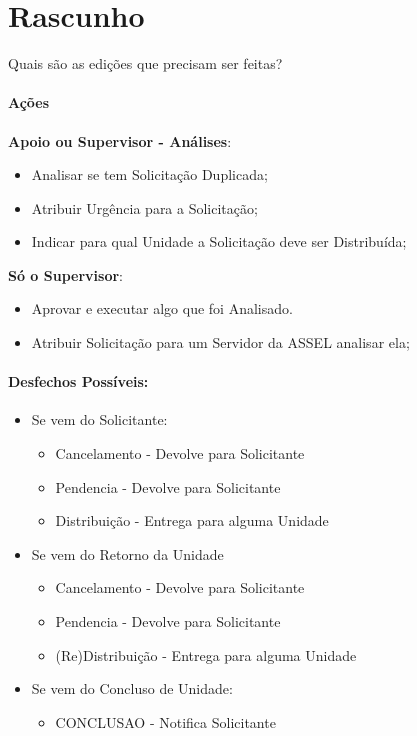 \chapter{Rascunho}

	Quais são as edições que precisam ser feitas?
	
	\subsubsection{Ações}
	\textbf{Apoio ou Supervisor - Análises}:
	\begin{itemize}
		\item Analisar se tem Solicitação Duplicada;
		\item Atribuir Urgência para a Solicitação;
		\item Indicar para qual Unidade a Solicitação deve ser Distribuída;		
	\end{itemize}
	
	
	
	\textbf{Só o Supervisor}:
	\begin{itemize}
		\item Aprovar e executar algo que foi Analisado. 
		\item Atribuir Solicitação para um Servidor da ASSEL analisar ela;
	\end{itemize}


	\subsubsection{Desfechos Possíveis:}
	\begin{itemize}
		\item Se vem do Solicitante:
		\begin{itemize}
			\item Cancelamento - Devolve para Solicitante
			\item Pendencia - Devolve para Solicitante
			\item Distribuição - Entrega para alguma Unidade
		\end{itemize}

		\item Se vem do Retorno da Unidade
		\begin{itemize}
			\item Cancelamento - Devolve para Solicitante
			\item Pendencia - Devolve para Solicitante
			\item (Re)Distribuição - Entrega para alguma Unidade
		\end{itemize}

		\item Se vem do Concluso de Unidade:
		\begin{itemize}
			\item CONCLUSAO - Notifica Solicitante 
		\end{itemize}

	\end{itemize}


